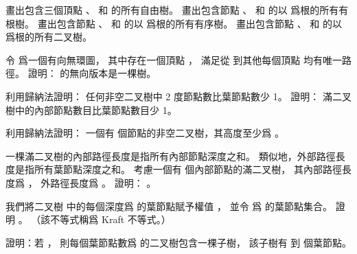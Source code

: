 \startsection[
  title={Trees},
]

\startEXERCISE
畫出包含三個頂點 、  和  的所有自由樹。
畫出包含節點 、  和  的以  爲根的所有有根樹。
畫出包含節點 、  和  的以  爲根的所有有序樹。
畫出包含節點 、  和  的以  爲根的所有二叉樹。
\stopEXERCISE

\startANSWER
{}
\stopANSWER

\startEXERCISE
令  爲一個有向無環圖，
其中存在一個頂點 ，
滿足從  到其他每個頂點  均有唯一路徑。
證明：  的無向版本是一棵樹。
\stopEXERCISE

\startANSWER
{}
\stopANSWER

\startEXERCISE
利用歸納法證明：
任何非空二叉樹中 2 度節點數比葉節點數少 1。
證明：
滿二叉樹中的內部節點數目比葉節點數目少 1。
\stopEXERCISE

\startANSWER
{}
\stopANSWER

\startEXERCISE
利用歸納法證明：
一個有  個節點的非空二叉樹，其高度至少爲 。
\stopEXERCISE

\startANSWER
{}
\stopANSWER

\startEXERCISE\DIFFICULT
一棵滿二叉樹的{\EMP 內部路徑長度}是指所有內部節點深度之和。
類似地，{\EMP 外部路徑長度}是指所有葉節點深度之和。
考慮一個有  個內部節點的滿二叉樹，
其內部路徑長度爲 ，
外路徑長度爲 。
證明： 。
\stopEXERCISE

\startANSWER
{}
\stopANSWER

\startEXERCISE\DIFFICULT
我們將二叉樹  中的每個深度爲  的葉節點賦予權值 ，
並令  爲  的葉節點集合。
證明 。
（該不等式稱爲 {\EMP Kraft 不等式}。）
\stopEXERCISE

\startANSWER
{}
\stopANSWER

\startEXERCISE\DIFFICULT
證明：若 ，
則每個葉節點數爲  的二叉樹包含一棵子樹，
該子樹有  到  個葉節點。
\stopEXERCISE

\startANSWER
{}
\stopANSWER

\stopsection
